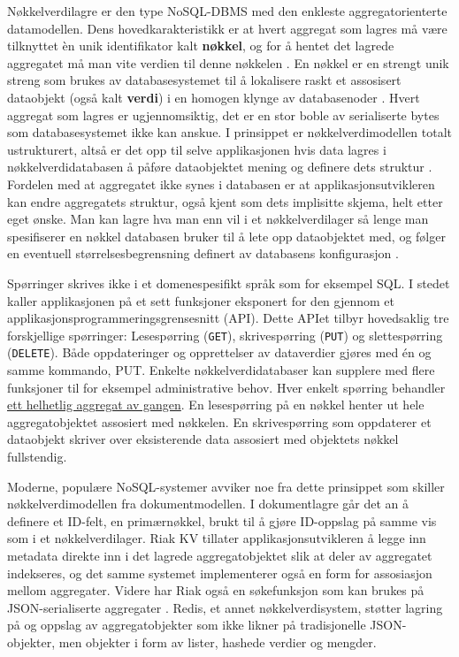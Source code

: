 Nøkkelverdilagre er den type NoSQL-DBMS med den enkleste aggregatorienterte datamodellen. Dens hovedkarakteristikk er at hvert aggregat som lagres må være tilknyttet èn unik identifikator kalt \textbf{nøkkel}, og for å hentet det lagrede aggregatet må man vite verdien til denne nøkkelen \citep{elmasri2014}. En nøkkel er en strengt unik streng som brukes av databasesystemet til å lokalisere raskt et assosisert dataobjekt (også kalt \textbf{verdi}) i en homogen klynge av databasenoder \citep{elmasri2014}. Hvert aggregat som lagres er ugjennomsiktig, det er en stor boble av serialiserte bytes som databasesystemet ikke kan anskue. I prinsippet er nøkkelverdimodellen totalt ustrukturert, altså er det opp til selve applikasjonen hvis data lagres i nøkkelverdidatabasen å påføre dataobjektet mening og definere dets struktur \citep{elmasri2014}. Fordelen med at aggregatet ikke synes i databasen er at applikasjonsutvikleren kan endre aggregatets struktur, også kjent som dets implisitte skjema, helt etter eget ønske. Man kan lagre hva man enn vil i et nøkkelverdilager så lenge man spesifiserer en nøkkel databasen bruker til å lete opp dataobjektet med, og følger en eventuell størrelsesbegrensning definert av databasens konfigurasjon \citep{sadalage2013}.

Spørringer skrives ikke i et domenespesifikt språk som for eksempel SQL. I stedet kaller applikasjonen på et sett funksjoner eksponert for den gjennom et applikasjonsprogrammeringsgrensesnitt (API). Dette APIet tilbyr hovedsaklig tre forskjellige spørringer: Lesespørring (\texttt{GET}), skrivespørring (\texttt{PUT}) og slettespørring (\texttt{DELETE}). Både oppdateringer og opprettelser av dataverdier gjøres med én og samme kommando, PUT. Enkelte nøkkelverdidatabaser kan supplere med flere funksjoner til for eksempel administrative behov. Hver enkelt spørring behandler \underline{ett helhetlig aggregat av gangen}. En lesespørring på en nøkkel henter ut hele aggregatobjektet assosiert med nøkkelen. En skrivespørring som oppdaterer et dataobjekt skriver over eksisterende data assosiert med objektets nøkkel fullstendig.

Moderne, populære NoSQL-systemer avviker noe fra dette prinsippet som skiller nøkkelverdimodellen fra dokumentmodellen. I dokumentlagre går det an å definere et ID-felt, en primærnøkkel, brukt til å gjøre ID-oppslag på samme vis som i et nøkkelverdilager. Riak KV tillater applikasjonsutvikleren å legge inn metadata direkte inn i det lagrede aggregatobjektet slik at deler av aggregatet indekseres, og det samme systemet implementerer også en form for assosiasjon mellom aggregater. Videre har Riak også en søkefunksjon som kan brukes på JSON-serialiserte aggregater \citep{sadalage2013}. Redis, et annet nøkkelverdisystem, støtter lagring på og oppslag av aggregatobjekter som ikke likner på tradisjonelle JSON-objekter, men objekter i form av lister, hashede verdier og mengder.

